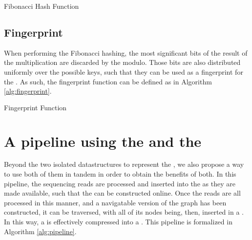 \begin{algorithm}
  \caption{Fibonacci Hash Function}\label{alg:fibonacci-hash}
\end{algorithm}

\subsection{Fingerprint}\label{sec:fingerprint}

When performing the Fibonacci hashing, the most significant bits of the result of the multiplication are discarded by the modulo.
Those bits are also distributed uniformly over the possible keys, such that they can be used as a fingerprint for the \kmer.
As such, the fingerprint function can be defined as in Algorithm \ref{alg:fingerprint}. 

\begin{algorithm}
  \caption{Fingerprint Function}\label{alg:fingerprint}
\end{algorithm}




\section{A pipeline using the \dBCM and the \dBHT}

Beyond the two isolated datastructures to represent the \dBG, we also propose a way to use both of them in tandem in order to obtain
the benefits of both. In this pipeline, the sequencing reads are processed and inserted into the \dBCM as they are made available,
such that the \dBG can be constructed online. Once the reads are all processed in this manner, and a navigatable version of the graph 
has been constructed, it can be traversed, with all of its nodes being, then, inserted in a \dBHT. In this way, a \dBCM is effectively
compressed into a \dBHT. This pipeline is formalized in Algorithm \ref{alg:pipeline}.

